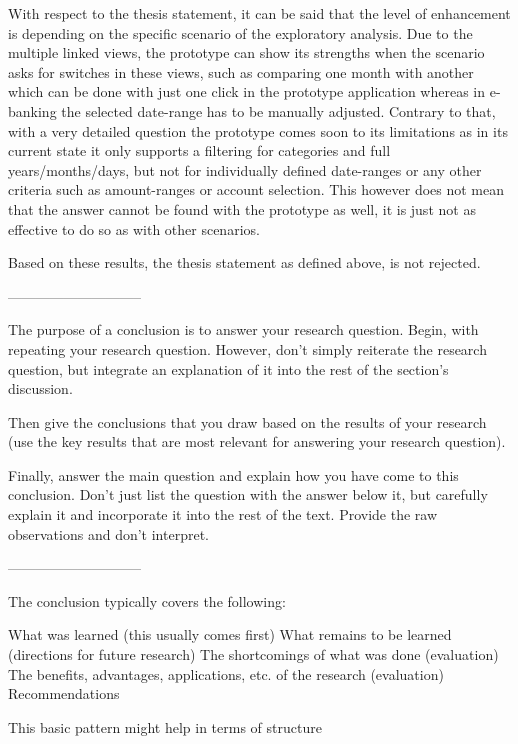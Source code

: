 With respect to the thesis statement, it can be said that the level of enhancement is depending on the specific scenario of the exploratory analysis. Due to the multiple linked views, the prototype can show its strengths when the scenario asks for switches in these views, such as comparing one month with another which can be done with just one click in the prototype application whereas in e-banking the selected date-range has to be manually adjusted. Contrary to that, with a very detailed question the prototype comes soon to its limitations as in its current state it only supports a filtering for categories and full years/months/days, but not for individually defined date-ranges or any other criteria such as amount-ranges or account selection. This however does not mean that the answer cannot be found with the prototype as well, it is just not as effective to do so as with other scenarios.
\begin{framed}
	\textit{\thesisstatementtext}
\end{framed}

Based on these results, the thesis statement as defined above, is not rejected.




-----------------------------

The purpose of a conclusion is to answer your research question. Begin, with repeating your research question. However, don’t simply reiterate the research question, but integrate an explanation of it into the rest of the section’s discussion.

Then give the conclusions that you draw based on the results of your research (use the key results that are most relevant for answering your research question).

Finally, answer the main question and explain how you have come to this conclusion. Don’t just list the question with the answer below it, but carefully explain it and incorporate it into the rest of the text. Provide the raw observations and don’t interpret.

-----------------------------


The conclusion typically covers the following:

What was learned (this usually comes first)
What remains to be learned (directions for future research)
The shortcomings of what was done (evaluation)
The benefits, advantages, applications, etc. of the research (evaluation)
Recommendations


This basic pattern might help in terms of structure

